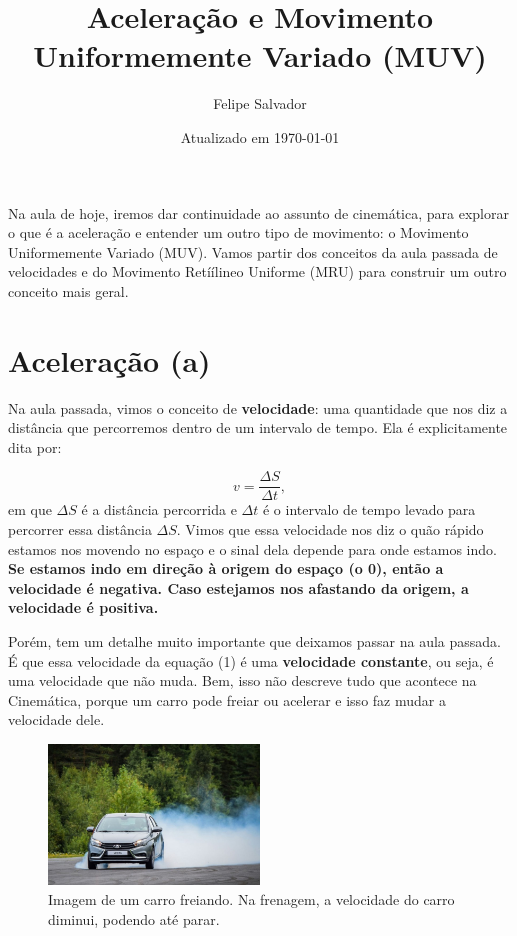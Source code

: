 \documentclass[12pt]{extarticle}
\title{Aceleração e Movimento Uniformemente Variado (MUV)}
\author{Felipe Salvador}
\date{Atualizado em \today}
\newcommand{\<}{\langle}
\renewcommand{\>}{\rangle}
\theoremstyle{definition}
\begin{document}
\maketitle

Na aula de hoje, iremos dar continuidade ao assunto de cinemática, para explorar o que é a aceleração e entender um outro tipo de movimento: o Movimento Uniformemente Variado (MUV). Vamos partir dos conceitos da aula passada de velocidades e do Movimento Retíílineo Uniforme (MRU) para construir um outro conceito mais geral.

\section{Aceleração (a)}

Na aula passada, vimos o conceito de \textbf{velocidade}: uma quantidade que nos diz a distância que percorremos dentro de um intervalo de tempo. Ela é explicitamente dita por:

\begin{equation}
    v = \frac{\Delta S}{\Delta t},
\end{equation}
em que $\Delta S$ é a distância percorrida e $\Delta t$ é o intervalo de tempo levado para percorrer essa distância $\Delta S$. Vimos que essa velocidade nos diz o quão rápido estamos nos movendo no espaço e o sinal dela depende para onde estamos indo. \textbf{Se estamos indo em direção à origem do espaço (o 0), então a velocidade é negativa. Caso estejamos nos afastando da origem, a velocidade é positiva.}

Porém, tem um detalhe muito importante que deixamos passar na aula passada. É que essa velocidade da equação (1) é uma \textbf{velocidade constante}, ou seja, é uma velocidade que não muda. Bem, isso não descreve tudo que acontece na Cinemática, porque um carro pode freiar ou acelerar e isso faz mudar a velocidade dele.

\begin{figure}[H]
    \centering
    \includegraphics[width = 0.5\textwidth]{economizar-combustivel-evite-frear-e-acelerar-bruscamente.jpg}
    \caption{Imagem de um carro freiando. Na frenagem, a velocidade do carro diminui, podendo até parar.}
    \label{fig:brake}
\end{figure}
\end{document}
